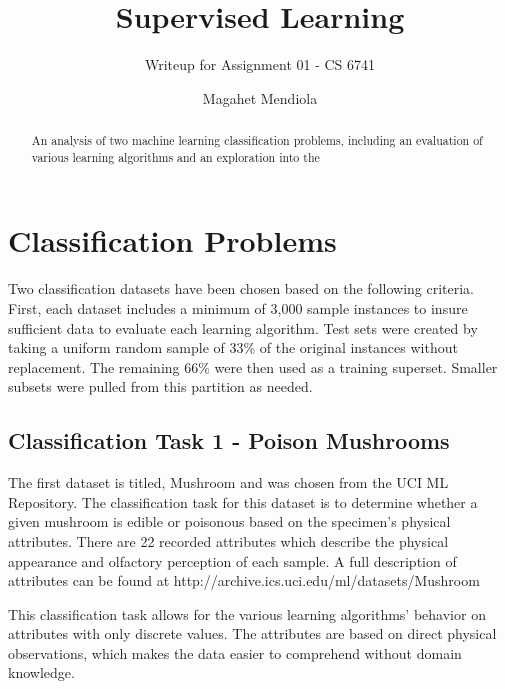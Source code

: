 \documentclass{sig-alternate}
\begin{document}
\title{Supervised Learning}
\subtitle{Writeup for Assignment 01 - CS 6741}

\author{
\alignauthor
Magahet Mendiola
}
\date{}

\maketitle
\begin{abstract}
An analysis of two machine learning classification problems, including an evaluation of various learning algorithms and an exploration into the 
\end{abstract}
 


\section{Classification Problems}

Two classification datasets have been chosen based on the following criteria. First, each dataset includes a minimum of 3,000 sample instances to insure sufficient data to evaluate each learning algorithm. Test sets were created by taking a uniform random sample of 33\% of the original instances without replacement. The remaining 66\% were then used as a training superset. Smaller subsets were pulled from this partition as needed.


\subsection{Classification Task 1 - Poison Mushrooms}

The first dataset is titled, Mushroom \cite{Bache+Lichman:2013} and was chosen from the UCI ML Repository. The classification task for this dataset is to determine whether a given mushroom is edible or poisonous based on the specimen's physical attributes. There are 22 recorded attributes which describe the physical appearance and olfactory perception of each sample. A full description of attributes can be found at http://archive.ics.uci.edu/ml/datasets/Mushroom

This classification task allows for the  various learning algorithms' behavior on attributes with only discrete values. The attributes are based on direct physical observations, which makes the data easier to comprehend without domain knowledge.
\end{document}
